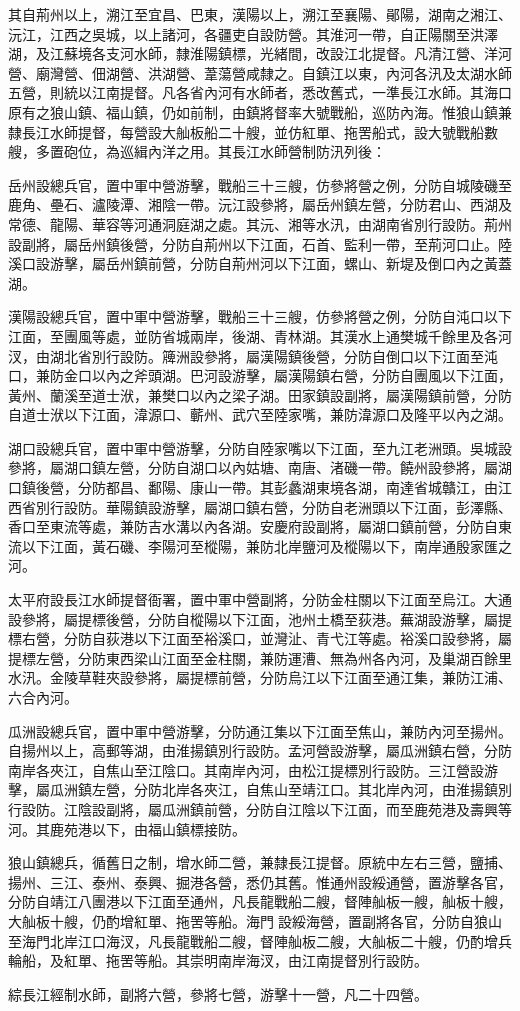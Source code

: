 \begin{pinyinscope}
其自荊州以上，溯江至宜昌、巴東，漢陽以上，溯江至襄陽、鄖陽，湖南之湘江、沅江，江西之吳城，以上諸河，各疆吏自設防營。其淮河一帶，自正陽關至洪澤湖，及江蘇境各支河水師，隸淮陽鎮標，光緒間，改設江北提督。凡清江營、洋河營、廟灣營、佃湖營、洪湖營、葦蕩營咸隸之。自鎮江以東，內河各汛及太湖水師五營，則統以江南提督。凡各省內河有水師者，悉改舊式，一準長江水師。其海口原有之狼山鎮、福山鎮，仍如前制，由鎮將督率大號戰船，巡防內海。惟狼山鎮兼隸長江水師提督，每營設大舢板船二十艘，並仿紅單、拖罟船式，設大號戰船數艘，多置砲位，為巡緝內洋之用。其長江水師營制防汛列後：

岳州設總兵官，置中軍中營游擊，戰船三十三艘，仿參將營之例，分防自城陵磯至鹿角、壘石、瀘陵潭、湘陰一帶。沅江設參將，屬岳州鎮左營，分防君山、西湖及常德、龍陽、華容等河通洞庭湖之處。其沅、湘等水汛，由湖南省別行設防。荊州設副將，屬岳州鎮後營，分防自荊州以下江面，石首、監利一帶，至荊河口止。陸溪口設游擊，屬岳州鎮前營，分防自荊州河以下江面，螺山、新堤及倒口內之黃蓋湖。

漢陽設總兵官，置中軍中營游擊，戰船三十三艘，仿參將營之例，分防自沌口以下江面，至團風等處，並防省城兩岸，後湖、青林湖。其漢水上通樊城千餘里及各河汊，由湖北省別行設防。簰洲設參將，屬漢陽鎮後營，分防自倒口以下江面至沌口，兼防金口以內之斧頭湖。巴河設游擊，屬漢陽鎮右營，分防自團風以下江面，黃州、蘭溪至道士洑，兼樊口以內之梁子湖。田家鎮設副將，屬漢陽鎮前營，分防自道士洑以下江面，湋源口、蘄州、武穴至陸家嘴，兼防湋源口及隆平以內之湖。

湖口設總兵官，置中軍中營游擊，分防自陸家嘴以下江面，至九江老洲頭。吳城設參將，屬湖口鎮左營，分防自湖口以內姑塘、南唐、渚磯一帶。饒州設參將，屬湖口鎮後營，分防都昌、鄱陽、康山一帶。其彭蠡湖東境各湖，南達省城贛江，由江西省別行設防。華陽鎮設游擊，屬湖口鎮右營，分防自老洲頭以下江面，彭澤縣、香口至東流等處，兼防吉水溝以內各湖。安慶府設副將，屬湖口鎮前營，分防自東流以下江面，黃石磯、李陽河至樅陽，兼防北岸鹽河及樅陽以下，南岸通殷家匯之河。

太平府設長江水師提督衙署，置中軍中營副將，分防金柱關以下江面至烏江。大通設參將，屬提標後營，分防自樅陽以下江面，池州土橋至荻港。蕪湖設游擊，屬提標右營，分防自荻港以下江面至裕溪口，並灣沚、青弋江等處。裕溪口設參將，屬提標左營，分防東西梁山江面至金柱關，兼防運漕、無為州各內河，及巢湖百餘里水汛。金陵草鞋夾設參將，屬提標前營，分防烏江以下江面至通江集，兼防江浦、六合內河。

瓜洲設總兵官，置中軍中營游擊，分防通江集以下江面至焦山，兼防內河至揚州。自揚州以上，高郵等湖，由淮揚鎮別行設防。孟河營設游擊，屬瓜洲鎮右營，分防南岸各夾江，自焦山至江陰口。其南岸內河，由松江提標別行設防。三江營設游擊，屬瓜洲鎮左營，分防北岸各夾江，自焦山至靖江口。其北岸內河，由淮揚鎮別行設防。江陰設副將，屬瓜洲鎮前營，分防自江陰以下江面，而至鹿苑港及壽興等河。其鹿苑港以下，由福山鎮標接防。

狼山鎮總兵，循舊日之制，增水師二營，兼隸長江提督。原統中左右三營，鹽捕、揚州、三江、泰州、泰興、掘港各營，悉仍其舊。惟通州設綏通營，置游擊各官，分防自靖江八團港以下江面至通州，凡長龍戰船二艘，督陣舢板一艘，舢板十艘，大舢板十艘，仍酌增紅單、拖罟等船。海門設綏海營，置副將各官，分防自狼山至海門北岸江口海汊，凡長龍戰船二艘，督陣舢板二艘，大舢板二十艘，仍酌增兵輪船，及紅單、拖罟等船。其崇明南岸海汊，由江南提督別行設防。

綜長江經制水師，副將六營，參將七營，游擊十一營，凡二十四營。


\end{pinyinscope}